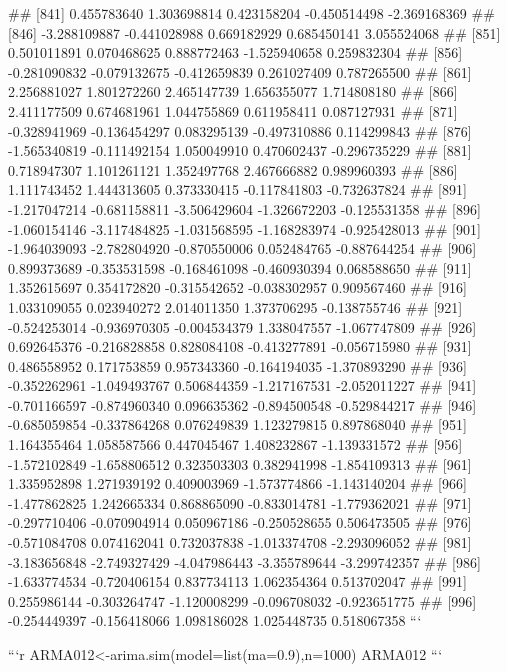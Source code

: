 \documentclass[
]{article}
\begin{document}
\begin{enumerate}[label=(\alph*)]
##  [841]  0.455783640  1.303698814  0.423158204 -0.450514498 -2.369168369
##  [846] -3.288109887 -0.441028988  0.669182929  0.685450141  3.055524068
##  [851]  0.501011891  0.070468625  0.888772463 -1.525940658  0.259832304
##  [856] -0.281090832 -0.079132675 -0.412659839  0.261027409  0.787265500
##  [861]  2.256881027  1.801272260  2.465147739  1.656355077  1.714808180
##  [866]  2.411177509  0.674681961  1.044755869  0.611958411  0.087127931
##  [871] -0.328941969 -0.136454297  0.083295139 -0.497310886  0.114299843
##  [876] -1.565340819 -0.111492154  1.050049910  0.470602437 -0.296735229
##  [881]  0.718947307  1.101261121  1.352497768  2.467666882  0.989960393
##  [886]  1.111743452  1.444313605  0.373330415 -0.117841803 -0.732637824
##  [891] -1.217047214 -0.681158811 -3.506429604 -1.326672203 -0.125531358
##  [896] -1.060154146 -3.117484825 -1.031568595 -1.168283974 -0.925428013
##  [901] -1.964039093 -2.782804920 -0.870550006  0.052484765 -0.887644254
##  [906]  0.899373689 -0.353531598 -0.168461098 -0.460930394  0.068588650
##  [911]  1.352615697  0.354172820 -0.315542652 -0.038302957  0.909567460
##  [916]  1.033109055  0.023940272  2.014011350  1.373706295 -0.138755746
##  [921] -0.524253014 -0.936970305 -0.004534379  1.338047557 -1.067747809
##  [926]  0.692645376 -0.216828858  0.828084108 -0.413277891 -0.056715980
##  [931]  0.486558952  0.171753859  0.957343360 -0.164194035 -1.370893290
##  [936] -0.352262961 -1.049493767  0.506844359 -1.217167531 -2.052011227
##  [941] -0.701166597 -0.874960340  0.096635362 -0.894500548 -0.529844217
##  [946] -0.685059854 -0.337864268  0.076249839  1.123279815  0.897868040
##  [951]  1.164355464  1.058587566  0.447045467  1.408232867 -1.139331572
##  [956] -1.572102849 -1.658806512  0.323503303  0.382941998 -1.854109313
##  [961]  1.335952898  1.271939192  0.409003969 -1.573774866 -1.143140204
##  [966] -1.477862825  1.242665334  0.868865090 -0.833014781 -1.779362021
##  [971] -0.297710406 -0.070904914  0.050967186 -0.250528655  0.506473505
##  [976] -0.571084708  0.074162041  0.732037838 -1.013374708 -2.293096052
##  [981] -3.183656848 -2.749327429 -4.047986443 -3.355789644 -3.299742357
##  [986] -1.633774534 -0.720406154  0.837734113  1.062354364  0.513702047
##  [991]  0.255986144 -0.303264747 -1.120008299 -0.096708032 -0.923651775
##  [996] -0.254449397 -0.156418066  1.098186028  1.025448735  0.518067358
```

```r
ARMA012<-arima.sim(model=list(ma=0.9),n=1000)
ARMA012
```


\end{enumerate}
\end{document}

